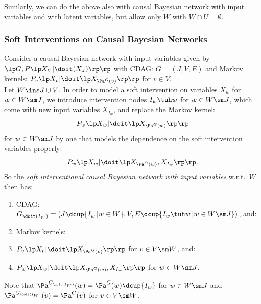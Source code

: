 \begin{Rem}
    Similarly, we can do the above also with causal Bayesian network with input variables and with latent variables, 
    but allow only $W$ with $W \cap U = \emptyset$.
\end{Rem}


\subsubsection{Soft Interventions on Causal Bayesian Networks}

\begin{Rem}
    \label{I-CBN-soft-int}
    Consider a  causal Bayesian network with input variables given by $\lp G, P\lp X_V|\doit(X_J)\rp\rp$ 
    with CDAG: $G=(J,V,E)$ and Markov kernels: $P_v\lp X_v|\doit\lp X_{\Pa^G(v)}\rp\rp$ for $v \in V$.\\
    Let $W \ins J \cup V$. %
    In order to model a soft intervention on variables $X_w$ for $w \in W\sm J$, we introduce 
    intervention nodes $I_w \tuh w$ for $w \in W \sm J$, which come with new input variables $X_{I_w}$, 
    and replace 
    the Markov kernel: 
    \[P_w\lp X_w|\doit\lp X_{\Pa^G(w)}\rp\rp\]
    for $w \in W\sm J$ by one that models the dependence on the 
    soft intervention variables properly:
    \[  P_w\lp X_w|\doit\lp X_{\Pa^G(w)},X_{I_w}\rp\rp. \]
    So the \emph{soft interventional causal Bayesian network with input variables} w.r.t.\ $W$ then has: 
        \begin{enumerate}
            \item CDAG: $G_{\doit(I_W)} = (J \dcup \{I_w\,|w \in W\}, V, E \dcup \{I_w \tuh w\,|w \in W\sm J\}) $, and:
        \item Markov kernels: 
        \item[] $P_v\lp X_v|\doit\lp X_{\Pa^G(v)}\rp\rp$ for $v \in V \sm W$, and:
        \item[] $P_w\lp X_w|\doit\lp X_{\Pa^G(w)}, X_{I_w}\rp\rp$ for $w \in W\sm J$.
    \end{enumerate}
    Note that $\Pa^{G_{\doit(I_W)}}(w)= \Pa^G(w) \dcup \{I_w\}$ for $w \in W\sm J$ and 
    $\Pa^{G_{\doit(I_W)}}(v)= \Pa^G(v)$ for $v \in V \sm W$. 
\end{Rem}

